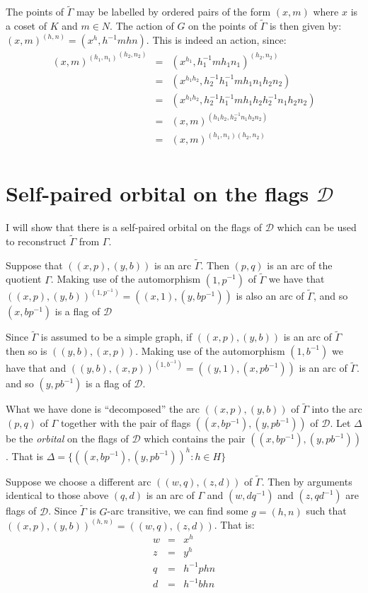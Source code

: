 \documentclass[12pt]{amsart}
\theoremstyle{plain}
\theoremstyle{definition}
\theoremstyle{remark}
\newcommand{\cD}{\mathcal{D}}
\begin{document}
The points of $\widetilde{\Gamma}$ may be labelled by ordered pairs of the form
$(x, m)$ where $x$ is a coset of $K$ and $m \in N$.
The action of $G$ on the points of $\widetilde{\Gamma}$ is then given by: 
$(x,m)^{(h,n)} = (x^h, h^{-1}mhn)$. 
This is indeed an action, since:
\begin{eqnarray*}
{(x,m)^{(h_1,n_1)}}^{(h_2,n_2)} & = & (x^{h_1}, h_{1}^{-1} m h_1 n_1)^{(h_2,n_2)} \\
                                & = & (x^{h_1 h_2}, h_{2}^{-1}h_1^{-1} m h_1 n_1 h_2 n_2) \\
                      & = & (x^{h_1 h_2}, h_{2}^{-1}h_1^{-1} m h_1 h_2 h_2^{-1} n_1 h_2 n_2) \\
		      & = & (x,m)^{(h_1 h_2, h_2^{-1} n_1 h_2 n_2)} \\
		      & = & (x,m)^{(h_1,n_1)(h_2,n_2)} \\
\end{eqnarray*}


\section{Self-paired orbital on the flags $\cD$}

I will show that there is a self-paired orbital on the flags
of $\cD$ which can be used to reconstruct $\widetilde{\Gamma}$
from $\Gamma$.

Suppose that $((x,p), (y,b))$ is an arc $\widetilde{\Gamma}$.
Then $(p,q)$ is an arc of the quotient $\Gamma$.
Making use of the automorphism $(1,p^{-1})$ of $\widetilde{\Gamma}$
we have that $((x,p), (y,b))^{(1,p^{-1})} = ((x,1), (y,bp^{-1}))$ 
is also an arc of $\widetilde{\Gamma}$,
and so $(x,bp^{-1})$ is a flag of $\cD$

Since $\widetilde{\Gamma}$ is assumed to be a simple graph,
if $((x,p), (y,b))$ is an arc of $\widetilde{\Gamma}$
then so is $((y,b),(x,p))$.
Making use of the automorphism $(1,b^{-1})$ we have that
and $((y,b),(x,p))^{(1,b^{-1})} = ((y,1), (x,pb^{-1}))$
is an arc of $\widetilde{\Gamma}$.
and so $(y, pb^{-1})$ is a flag of $\cD$.

What we have done is ``decomposed'' the arc $((x,p), (y,b))$
of $\widetilde{\Gamma}$ into the arc $(p,q)$ of $\Gamma$
together with the pair of flags $((x,bp^{-1}),(y, pb^{-1}))$
of $\cD$.
Let $\Delta$ be the {\it orbital} on the flags of $\cD$
which contains the pair $((x,bp^{-1}),(y, pb^{-1}))$.
That is $\Delta = \{ ((x,bp^{-1}),(y, pb^{-1}))^h : h \in H \}$
\hfill \break

Suppose we choose a different arc $((w,q),(z,d))$ of $\widetilde{\Gamma}$.
Then by arguments identical to those above $(q,d)$ is an arc of $\Gamma$
and $(w,dq^{-1})$ and $(z,qd^{-1})$ are flags of $\cD$.
Since $\widetilde{\Gamma}$ is $G$-arc transitive, we can find some $g = (h,n)$
such that $((x,p),(y,b))^{(h,n)} = ((w,q),(z,d))$.
That is:
\begin{eqnarray*}
w & = & x^h \\
z & = & y^h \\
q & = &  h^{-1}phn \\
d & = &  h^{-1}bhn \\
\end{eqnarray*}
\end{document}
